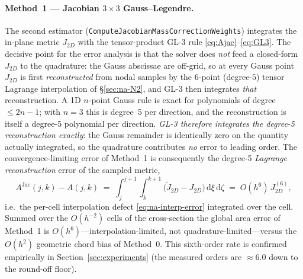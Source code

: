 \documentclass[11pt]{article}
\theoremstyle{definition}
\theoremstyle{remark}
\begin{document}
\paragraph{Method~1 --- Jacobian $3\times3$ Gauss--Legendre.}
The second estimator (\texttt{ComputeJacobianMassCorrectionWeights}) integrates
the in-plane metric $J_{2D}$ with the tensor-product GL-3 rule
\eqref{eq:Ajac}--\eqref{eq:GL3}. The decisive point for the error analysis is that
the solver does \emph{not} feed a closed-form $J_{2D}$ to the quadrature: the Gauss
abscissae are off-grid, so at every Gauss point $J_{2D}$ is first \emph{reconstructed}
from nodal samples by the $6$-point (degree-$5$) tensor Lagrange interpolation of
\S\ref{sec:na-N2}, and GL-3 then integrates \emph{that} reconstruction. A 1D
$n$-point Gauss rule is exact for polynomials of degree $\le 2n-1$; with $n=3$ this is
degree~5 per direction, and the reconstruction is itself a degree-5 polynomial per
direction. \emph{GL-3 therefore integrates the degree-5 reconstruction exactly}: the
Gauss remainder is identically zero on the quantity actually integrated, so the
quadrature contributes \emph{no} error to leading order. The convergence-limiting
error of Method~1 is consequently the degree-5 \emph{Lagrange reconstruction} error of
the sampled metric,
\begin{equation}
  A^{\mathrm{Jac}}(j,k)-A(j,k)
  \;=\; \int_{j}^{j+1}\!\!\int_{k}^{k+1}\!\!
        \bigl(\tilde J_{2D}-J_{2D}\bigr)\,\mathrm{d}\xi\,\mathrm{d}\zeta
  \;=\; O(h^{6})\,J_{2D}^{(6)},
  \label{eq:na-method1-error}
\end{equation}
i.e.\ the per-cell interpolation defect \eqref{eq:na-interp-error} integrated over the
cell. Summed over the $O(h^{-2})$ cells of the cross-section the global area error of
Method~1 is $O(h^{6})$---interpolation-limited, not quadrature-limited---versus the
$O(h^{2})$ geometric chord bias of Method~0. This sixth-order rate is confirmed
empirically in Section~\ref{sec:experiments} (the measured orders are $\approx 6.0$
down to the round-off floor).
\end{document}
